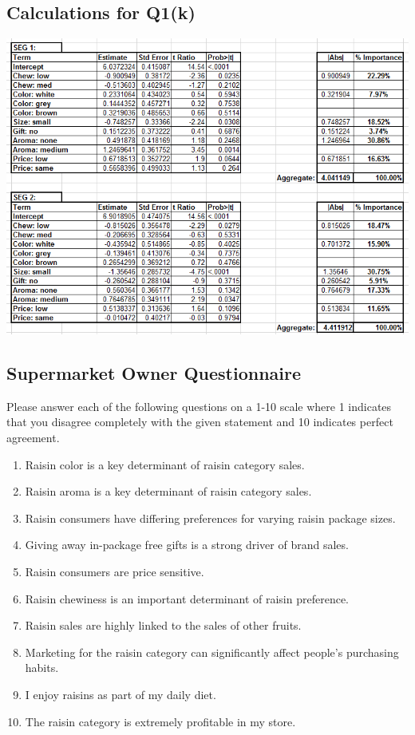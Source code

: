 \documentclass[10pt, oneside,spanish]{article}
\begin{document}
\subsection{Calculations for Q1(k)}

\begin{center}
\includegraphics[width=14cm]{1k.PNG}
\end{center}

\pagebreak

\subsection{Supermarket Owner Questionnaire}


Please answer each of the following questions on a 1-10 scale where 1 indicates that you disagree completely with the given statement and 10 indicates perfect agreement.
\begin{enumerate}


\item Raisin color is a key determinant of raisin category sales.
\item Raisin aroma is a key determinant of raisin category sales.
\item Raisin consumers have differing preferences for varying raisin package sizes.
\item Giving away in-package free gifts is a strong driver of brand sales.
\item Raisin consumers are price sensitive.
\item Raisin chewiness is an important determinant of raisin preference.
\item Raisin sales are highly linked to the sales of other fruits.
\item Marketing for the raisin category can significantly affect people’s purchasing habits.
\item I enjoy raisins as part of my daily diet.
\item The raisin category is extremely profitable in my store.

\end{enumerate}
\end{document}
